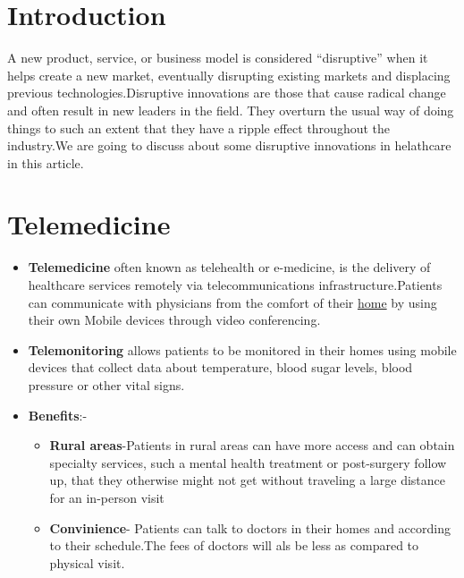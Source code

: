 \documentclass[12pt]{article}
\begin{document}
\section*{Introduction}
A new product, service, or business model is considered “disruptive” when it helps create a new market, eventually disrupting existing markets and displacing previous technologies.Disruptive innovations are those that cause radical change and often result in new leaders in the field. They overturn the usual way of doing things to such an extent that they have a ripple effect throughout the industry.We are going to discuss about some disruptive innovations in helathcare in this article.

\section{Telemedicine}

\begin{itemize}

\item \textbf{Telemedicine} often known as telehealth or e-medicine, is the delivery of healthcare services remotely via telecommunications infrastructure.Patients can communicate with physicians from the comfort of their \underline{home} by using their own Mobile devices through video conferencing.


\item \textbf{Telemonitoring} allows patients to be monitored in their homes using mobile devices that collect data about temperature, blood sugar levels, blood pressure or other vital signs.

\item \textbf{Benefits}:-
\begin{itemize}

\item \textbf{Rural areas}-Patients in rural areas can have more access and can obtain specialty services, such a mental health treatment or post-surgery follow up, that they otherwise might not get without traveling a large distance for an in-person visit
\item \textbf{Convinience}- Patients can talk to doctors in their homes and according to their schedule.The fees of doctors will als be less as compared to physical visit.

\end{itemize}

\end{itemize}
\end{document}
